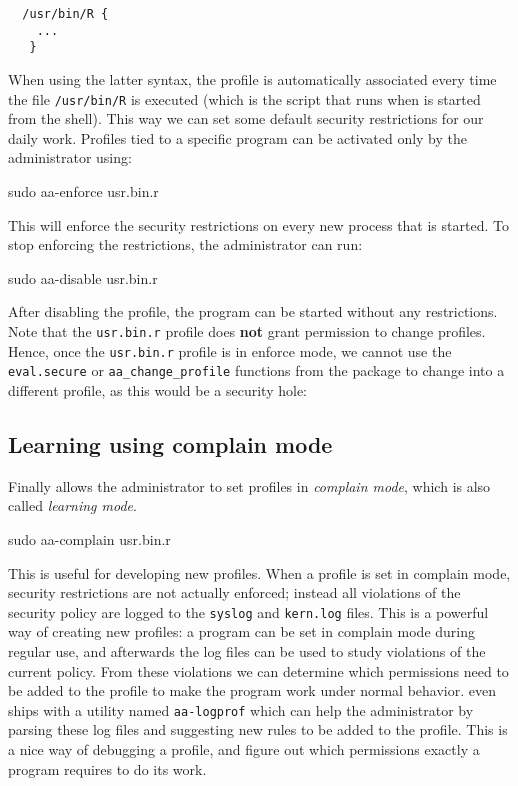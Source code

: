 \begin{footnotesize}
\begin{verbatim}
  /usr/bin/R {
    ...
   }
\end{verbatim}
\end{footnotesize}
When using the latter syntax, the profile is automatically associated every
time the file \texttt{/usr/bin/R} is executed (which is the script that runs
when \R is started from the shell). This way we can set some default security
restrictions for our daily work. Profiles tied to a specific program can be
activated only by the administrator using:
\begin{codeblock}
sudo aa-enforce usr.bin.r
\end{codeblock}
This will enforce the security restrictions on every new \R process that is
started. To stop enforcing the restrictions, the administrator can run:
\begin{codeblock}
sudo aa-disable usr.bin.r
\end{codeblock}
After disabling the profile, the \R program can be started without any
restrictions.
Note that the \texttt{usr.bin.r} profile does \textbf{not} grant permission to
change profiles. Hence, once the \texttt{usr.bin.r} profile is in enforce mode,
we cannot use the \texttt{eval.secure} or \texttt{aa\_change\_profile} functions
from the \RAppArmor package to change into a different profile, as this
would be a security hole:



\subsection{Learning using complain mode}

Finally \AppArmor allows the administrator to set profiles in \emph{complain
mode}, which is also called \emph{learning mode}.
\begin{codeblock}
sudo aa-complain usr.bin.r
\end{codeblock}
This is useful for developing new profiles. When a profile is set in complain
mode, security restrictions are not actually enforced; instead all violations
of the security policy are logged to the \texttt{syslog} and \texttt{kern.log}
files. This is a powerful way of creating new profiles: a program can be set in
complain mode during regular use, and afterwards the log files can be used to
study violations of the current policy. From these violations we can determine
which permissions need to be added to the profile to make the program work
under normal behavior. \AppArmor even ships with a utility named
\texttt{aa-logprof} which can help the administrator by parsing these log files and
suggesting new rules to be added to the profile. This is a nice way of
debugging a profile, and figure out which permissions exactly a program
requires to do its work.

